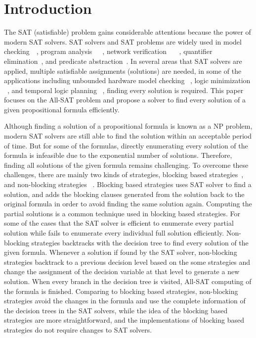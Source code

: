 \section{Introduction}
The SAT (satisfiable) problem gains considerable attentions because the power of modern SAT solvers. SAT solvers and SAT problems are widely used in model checking~\cite{bmc}~\cite{ic3}, program analysis~\cite{klee}~\cite{cpachecker}~\cite{cbmc}, network verification ~\cite{lopes2015checking}~\cite{majumdar2014kuai}~\cite{zhang2012verification}, quantifier elimination~\cite{brauer2011existential}, and predicate abstraction~\cite{lahiri2003symbolic}.
In several areas that SAT solvers are applied, multiple satisfiable assignments (solutions) are needed, in some of the applications including unbounded hardware model checking ~\cite{car}, logic minimization ~\cite{sapra2003sat}, and temporal logic planning ~\cite{aalta}, finding every solution is required. This paper focuses on the All-SAT problem and propose a solver \tool to find every solution of a given propositional formula efficiently.

Although finding a solution of a propositional formula is known as a NP problem, modern SAT solvers are still able to find the solution within an acceptable period of time. But for some of the formulas, directly enumerating every solution of the formula is infeasible due to the exponential number of solutions. Therefore, finding all solutions of the given formula remains challenging.
To overcome these challenges, there are mainly two kinds of strategies, blocking based strategies~\cite{mcmillan2002applying}, and non-blocking strategies ~\cite{grumberg2004memory}. Blocking based strategies uses SAT solver to find a solution, and adds the blocking clauses generated from the solution back to the original formula in order to avoid finding the same solution again. Computing the partial solutions is a common technique used in blocking based strategies. For some of the cases that the SAT solver is efficient to enumerate every partial solution while fails to enumerate every individual full solution efficiently. 
Non-blocking strategies backtracks with the decision tree to find every solution of the given formula. Whenever a solution if found by the SAT solver, non-blocking strategies backtrack to a previous decision level based on the some strategies and change the assignment of the decision variable at that level to generate a new solution. When every branch in the decision tree is visited, All-SAT computing of the formula is finished. 
Comparing to blocking based strategies, non-blocking strategies avoid the changes in the formula and use the complete information of the decision trees in the SAT solvers, while the idea of the blocking based strategies are more straightforward, and the implementations of blocking based strategies do not require changes to SAT solvers.

